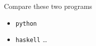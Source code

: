 \begin{frame}
\begin{block}{Compare these two programs}
\begin{itemize}
\item \lstinline{python}
\item \lstinline{haskell}
\ldots
\end{itemize}
\end{block}
\end{frame}
